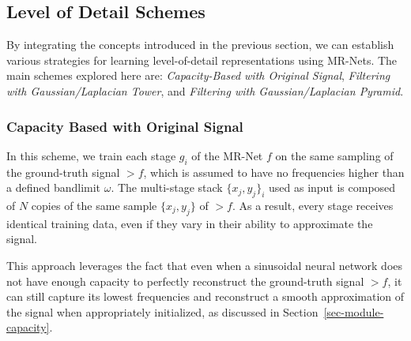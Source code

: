 

%



\pagebreak

\subsection{Level of Detail Schemes}
\label{s:lod}

By integrating the concepts introduced in the previous section, we can establish various strategies for learning level-of-detail representations using MR-Nets. The main schemes explored here are: \textit{Capacity-Based with Original Signal}, \textit{Filtering with Gaussian/Laplacian Tower}, and \textit{Filtering with Gaussian/Laplacian Pyramid}.

\subsubsection{Capacity Based with Original Signal}
In this scheme, we train each stage $g_i$ of the MR-Net $f$ on the same sampling of the ground-truth signal $\gt{f}$, which is assumed to have no frequencies higher than a defined bandlimit $\omega$. The multi-stage stack $\{x_j, y_j\}_i$ used as input is composed of $N$ copies of the same sample $\{x_j, y_j\}$ of $\gt{f}$. As a result, every stage receives identical training data, even if they vary in their ability to approximate the signal.

This approach leverages the fact that even when a sinusoidal neural network does not have enough capacity to perfectly reconstruct the ground-truth signal $\gt{f}$, it can still capture its lowest frequencies and reconstruct a smooth approximation of the signal when appropriately initialized, as discussed in Section~\ref{sec-module-capacity}. 


